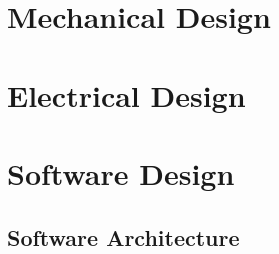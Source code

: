 \section{Mechanical Design}
\lipsum[11]

\section{Electrical Design}
\lipsum[30]

\section{Software Design}
\lipsum[30]

\subsection{Software Architecture}
\lipsum[30]



